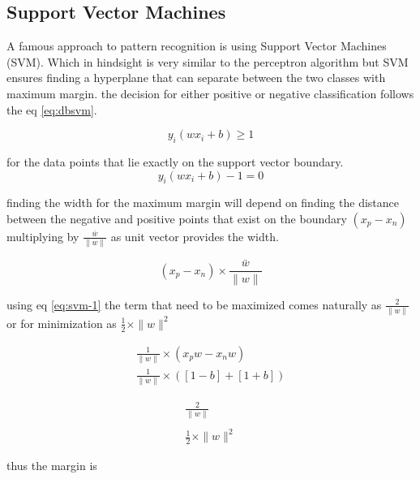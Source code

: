 \documentclass[10pt,onecolumn,letterpaper]{article}
\begin{document}
\subsection{Support Vector Machines}

A famous approach to pattern recognition is using Support Vector Machines (SVM). Which in hindsight is very similar to the perceptron algorithm but SVM ensures finding a hyperplane  that can separate between the two classes with maximum margin. the decision for either positive or negative classification follows the eq \ref{eq:dbsvm}. 


\begin{equation}
y_{i}\left(w x_{i}+b\right) \geq 1
\label{eq:dbsvm}
\end{equation}

for the data points that lie exactly on the support vector boundary. 
\begin{equation}
y_{i}\left(w x_{i}+b\right)-1=0
\label{eq:svm-1}
\end{equation}

finding the width for the maximum margin will depend on finding the distance between the negative and positive points that exist on the boundary $\left(x_{p}-x_{n}\right)$ multiplying by $\frac{\bar{w}}{\|w\|}$ as unit vector provides the width. 

\begin{equation}
\left(x_{p}-x_{n}\right) \times \frac{\bar{w}}{\|w\|}
\end{equation}

using eq \ref{eq:svm-1} the term that need to be maximized comes naturally as $\frac{2}{\|w\|}$ or for minimization as $\frac{1}{2} \times\|w\|^{2}$

\begin{equation}
\begin{array}{l}
\frac{1}{\|w\|} \times\left(x_{p} w-x_{n} w\right) \\
\frac{1}{\|w\|} \times([1-b]+[1+b])
\end{array}
\end{equation}


\begin{equation}
\begin{array}{l}
\frac{2}{\|w\|} \\ \\
\frac{1}{2} \times\|w\|^{2}
\end{array}
\end{equation}


thus the margin is 
\end{document}
